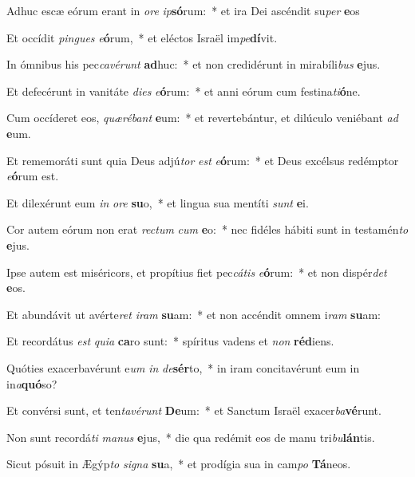 \item Adhuc escæ eórum erant in \textit{o}\textit{re} \textit{ip}\textbf{só}rum:~* et ira Dei ascéndit su\textit{per} \textbf{e}os
\item Et occídit \textit{pin}\textit{gues} \textit{e}\textbf{ó}rum,~* et eléctos Israël im\textit{pe}\textbf{dí}vit.
\item In ómnibus his pec\textit{ca}\textit{vé}\textit{runt} \textbf{ad}huc:~* et non credidérunt in mirabíli\textit{bus} \textbf{e}jus.
\item Et defecérunt in vanitáte \textit{di}\textit{es} \textit{e}\textbf{ó}rum:~* et anni eórum cum festina\textit{ti}\textbf{ó}ne.
\item Cum occíderet eos, \textit{quæ}\textit{ré}\textit{bant} \textbf{e}um:~* et revertebántur, et dilúculo veniébant \textit{ad} \textbf{e}um.
\item Et rememoráti sunt quia Deus adjú\textit{tor} \textit{est} \textit{e}\textbf{ó}rum:~* et Deus excélsus redémptor \textit{e}\textbf{ó}rum est.
\item Et dilexérunt eum \textit{in} \textit{o}\textit{re} \textbf{su}o,~* et lingua sua mentíti \textit{sunt} \textbf{e}i.
\item Cor autem eórum non erat \textit{rec}\textit{tum} \textit{cum} \textbf{e}o:~* nec fidéles hábiti sunt in testamén\textit{to} \textbf{e}jus.
\item Ipse autem est miséricors, et propítius fiet pec\textit{cá}\textit{tis} \textit{e}\textbf{ó}rum:~* et non dispér\textit{det} \textbf{e}os.
\item Et abundávit ut avérte\textit{ret} \textit{i}\textit{ram} \textbf{su}am:~* et non accéndit omnem i\textit{ram} \textbf{su}am:
\item Et recordátus \textit{est} \textit{qui}\textit{a} \textbf{ca}ro sunt:~* spíritus vadens et \textit{non} \textbf{réd}iens.
\item Quóties exacerbavérunt e\textit{um} \textit{in} \textit{de}\textbf{sér}to,~* in iram concitavérunt eum in in\textit{a}\textbf{quó}so?
\item Et convérsi sunt, et ten\textit{ta}\textit{vé}\textit{runt} \textbf{De}um:~* et Sanctum Israël exacer\textit{ba}\textbf{vé}runt.
\item Non sunt recordá\textit{ti} \textit{ma}\textit{nus} \textbf{e}jus,~* die qua redémit eos de manu tri\textit{bu}\textbf{lán}tis.
\item Sicut pósuit in Ægýp\textit{to} \textit{si}\textit{gna} \textbf{su}a,~* et prodígia sua in cam\textit{po} \textbf{Tá}neos.
